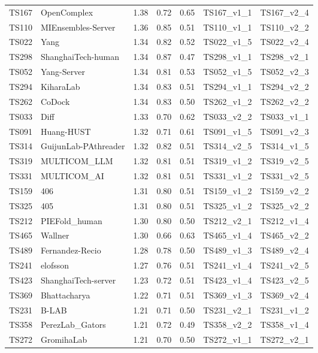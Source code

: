 \begin{longtable}{lllllll}
TS167 & OpenComplex & 1.38 & 0.72 & 0.65 & TS167\_v1\_1 & TS167\_v2\_4 \\ 
TS110 & MIEnsembles-Server & 1.36 & 0.85 & 0.51 & TS110\_v1\_1 & TS110\_v2\_2 \\ 
TS022 & Yang & 1.34 & 0.82 & 0.52 & TS022\_v1\_5 & TS022\_v2\_4 \\ 
TS298 & ShanghaiTech-human & 1.34 & 0.87 & 0.47 & TS298\_v1\_1 & TS298\_v2\_1 \\ 
TS052 & Yang-Server & 1.34 & 0.81 & 0.53 & TS052\_v1\_5 & TS052\_v2\_3 \\ 
TS294 & KiharaLab & 1.34 & 0.83 & 0.51 & TS294\_v1\_1 & TS294\_v2\_2 \\ 
TS262 & CoDock & 1.34 & 0.83 & 0.50 & TS262\_v1\_2 & TS262\_v2\_2 \\ 
TS033 & Diff & 1.33 & 0.70 & 0.62 & TS033\_v2\_2 & TS033\_v1\_1 \\ 
TS091 & Huang-HUST & 1.32 & 0.71 & 0.61 & TS091\_v1\_5 & TS091\_v2\_3 \\ 
TS314 & GuijunLab-PAthreader & 1.32 & 0.82 & 0.51 & TS314\_v2\_5 & TS314\_v1\_5 \\ 
TS319 & MULTICOM\_LLM & 1.32 & 0.81 & 0.51 & TS319\_v1\_2 & TS319\_v2\_5 \\ 
TS331 & MULTICOM\_AI & 1.32 & 0.81 & 0.51 & TS331\_v1\_2 & TS331\_v2\_5 \\ 
TS159 & 406 & 1.31 & 0.80 & 0.51 & TS159\_v1\_2 & TS159\_v2\_2 \\ 
TS325 & 405 & 1.31 & 0.80 & 0.51 & TS325\_v1\_2 & TS325\_v2\_2 \\ 
TS212 & PIEFold\_human & 1.30 & 0.80 & 0.50 & TS212\_v2\_1 & TS212\_v1\_4 \\ 
TS465 & Wallner & 1.30 & 0.66 & 0.63 & TS465\_v1\_4 & TS465\_v2\_2 \\ 
TS489 & Fernandez-Recio & 1.28 & 0.78 & 0.50 & TS489\_v1\_3 & TS489\_v2\_4 \\ 
TS241 & elofsson & 1.27 & 0.76 & 0.51 & TS241\_v1\_4 & TS241\_v2\_5 \\ 
TS423 & ShanghaiTech-server & 1.23 & 0.72 & 0.51 & TS423\_v1\_4 & TS423\_v2\_5 \\ 
TS369 & Bhattacharya & 1.22 & 0.71 & 0.51 & TS369\_v1\_3 & TS369\_v2\_4 \\ 
TS231 & B-LAB & 1.21 & 0.71 & 0.50 & TS231\_v2\_1 & TS231\_v1\_2 \\ 
TS358 & PerezLab\_Gators & 1.21 & 0.72 & 0.49 & TS358\_v2\_2 & TS358\_v1\_4 \\ 
TS272 & GromihaLab & 1.21 & 0.70 & 0.50 & TS272\_v1\_1 & TS272\_v2\_1 \\ 

\end{longtable}
